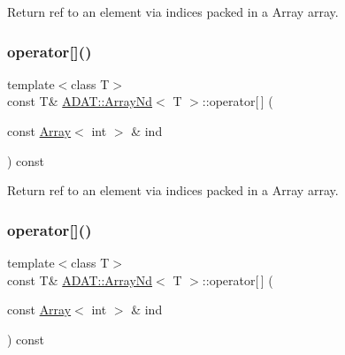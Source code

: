 Return ref to an element via indices packed in a Array array. 

\mbox{\label{classADAT_1_1ArrayNd_a3b7160cbd3939f68f4a23df8cc56d2df}} 
\subsubsection{\texorpdfstring{operator[]()}{operator[]()}\hspace{0.1cm}{\footnotesize\ttfamily [3/4]}}
{\footnotesize\ttfamily template$<$class T$>$ \\
const T\& \mbox{\hyperlink{classADAT_1_1ArrayNd}{A\+D\+A\+T\+::\+Array\+Nd}}$<$ T $>$\+::operator\mbox{[}$\,$\mbox{]} (\begin{DoxyParamCaption}\item[{const \mbox{\hyperlink{classXMLArray_1_1Array}{Array}}$<$ int $>$ \&}]{ind }\end{DoxyParamCaption}) const\hspace{0.3cm}{\ttfamily [inline]}}



Return ref to an element via indices packed in a Array array. 

\mbox{\label{classADAT_1_1ArrayNd_a3b7160cbd3939f68f4a23df8cc56d2df}} 
\subsubsection{\texorpdfstring{operator[]()}{operator[]()}\hspace{0.1cm}{\footnotesize\ttfamily [4/4]}}
{\footnotesize\ttfamily template$<$class T$>$ \\
const T\& \mbox{\hyperlink{classADAT_1_1ArrayNd}{A\+D\+A\+T\+::\+Array\+Nd}}$<$ T $>$\+::operator\mbox{[}$\,$\mbox{]} (\begin{DoxyParamCaption}\item[{const \mbox{\hyperlink{classXMLArray_1_1Array}{Array}}$<$ int $>$ \&}]{ind }\end{DoxyParamCaption}) const\hspace{0.3cm}{\ttfamily [inline]}}



